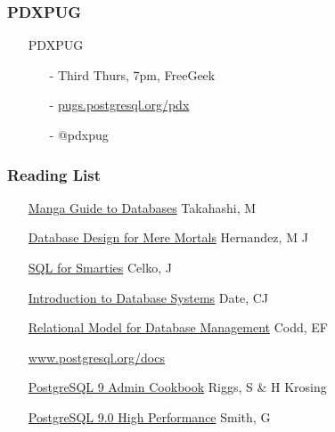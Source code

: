 \documentclass[20pt]{beamer}
\begin{document}
\frame
{
    \frametitle{PDXPUG}
    \begin{itemize}
    \item[] PDXPUG
	    \begin{itemize}
	    \item[-] Third Thurs, 7pm, FreeGeek
	    \item[-] \url{pugs.postgresql.org/pdx}
	    \item[-] @pdxpug
	    \end{itemize}
    \end{itemize}
}

\frame
{
    \frametitle{Reading List}
    \begin{itemize}
    \item[] \underline{Manga Guide to Databases} Takahashi, M
    \item[] \underline{Database Design for Mere Mortals} Hernandez, M J
    \item[] \underline{SQL for Smarties} Celko, J
    \item[] \underline{Introduction to Database Systems} Date, CJ
    \item[] \underline{Relational Model for Database Management} Codd, EF
    \item[] \url{www.postgresql.org/docs}
    \item[] \underline{PostgreSQL 9 Admin Cookbook} Riggs, S \& H Krosing
    \item[] \underline{PostgreSQL 9.0 High Performance} Smith, G
    \end{itemize}
}

\end{document}
